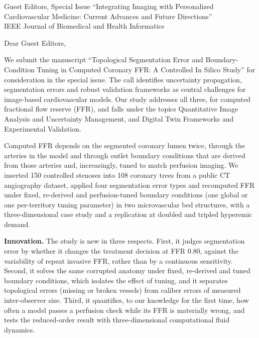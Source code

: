 \documentclass[10pt]{letter}
\date{\today}
\begin{document}
\begin{letter}{Guest Editors, Special Issue ``Integrating Imaging with Personalized Cardiovascular Medicine: Current
Advances and Future Directions''\\IEEE Journal of Biomedical and Health Informatics}
\opening{Dear Guest Editors,}

We submit the manuscript ``Topological Segmentation Error and Boundary-Condition Tuning in Computed Coronary FFR: A
Controlled In Silico Study'' for consideration in the special issue. The call identifies uncertainty propagation,
segmentation errors and robust validation frameworks as central challenges for image-based cardiovascular models. Our
study addresses all three, for computed fractional flow reserve (FFR), and falls under the topics Quantitative Image
Analysis and Uncertainty Management, and Digital Twin Frameworks and Experimental Validation.

Computed FFR depends on the segmented coronary lumen twice, through the arteries in the model and through outlet boundary conditions that are derived from those arteries and, increasingly, tuned to match perfusion imaging. We
inserted 150 controlled stenoses into 108 coronary trees from a public CT angiography dataset, applied four segmentation
error types and recomputed FFR under fixed, re-derived and perfusion-tuned boundary conditions (one global or one
per-territory tuning parameter) in two microvascular bed structures, with a three-dimensional case study and a
replication at doubled and tripled hyperemic demand.

\textbf{Innovation.} The study is new in three respects. First, it judges segmentation error by whether it changes
the treatment decision at FFR 0.80, against the variability of repeat invasive FFR, rather than by a continuous
sensitivity. Second, it solves the same corrupted anatomy under fixed, re-derived and tuned boundary conditions,
which isolates the effect of tuning, and it separates topological errors (missing or broken vessels) from caliber
errors of measured inter-observer size. Third, it quantifies, to our knowledge for the first time, how often a model
passes a perfusion check while its FFR is materially wrong, and tests the reduced-order result with
three-dimensional computational fluid dynamics.


\end{letter}
\end{document}

